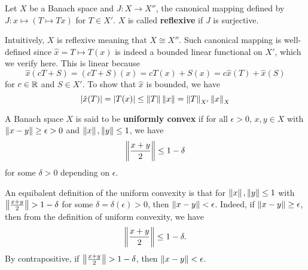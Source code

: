 \begin{definition}
    Let $X$ be a Banach space and $J:X\to X''$, the canonical mapping 
    defined by $J:x\mapsto(T\mapsto Tx)$ for $T\in X'$. $X$ is called 
    \textbf{reflexive} if $J$ is surjective. 
\end{definition}
\begin{remark}
    Intuitively, $X$ is reflexive meaning that $X\cong X''$. Such canonical 
    mapping is well-defined since $\hat{x} = T\mapsto T(x)$ is indeed a bounded linear 
    functional on $X'$, which we verify here. This is linear because 
    \begin{equation*}
        \hat{x}(cT + S) = (cT + S)(x) = cT(x) + S(x) = c\hat{x}(T) + \hat{x}(S)
    \end{equation*}
    for $c\in\mathbb{R}$ and $S\in X'$. To show that $\hat{x}$ is bounded, we have 
    \begin{equation*}
        \left\lvert {\hat{x}(T)} \right\rvert = \left\lvert {T(x)} \right\rvert \leq \left\lVert {T} \right\rVert\left\lVert {x} \right\rVert = \left\lVert {T} \right\rVert_{X'}\left\lVert {x} \right\rVert_{X}
    \end{equation*}
\end{remark}

\begin{definition}
    A Banach space $X$ is said to be \textbf{uniformly convex} if for 
    all $\epsilon>0$, $x,y\in X$ with $\left\lVert {x-y} \right\rVert\geq \epsilon>0$ and 
    $\left\lVert {x} \right\rVert,\left\lVert {y} \right\rVert\leq 1$, we have 
    \begin{equation*}
        \left\lVert {\frac{x+y}{2}} \right\rVert \leq 1-\delta
    \end{equation*}
    for some $\delta>0$ depending on $\epsilon$.
\end{definition}
\begin{remark}
    An equibalent definition of the uniform convexity is that for 
    $\left\lVert {x} \right\rVert,\left\lVert {y} \right\rVert\leq 1$ with $\left\lVert {\frac{x+y}{2}} \right\rVert> 1-\delta$ 
    for some $\delta = \delta(\epsilon)>0$, then $\left\lVert {x-y} \right\rVert< \epsilon$. 
    Indeed, if $\left\lVert {x-y} \right\rVert\geq\epsilon$, then from the 
    definition of uniform convexity, we have 
    \begin{equation*}
        \left\lVert {\frac{x+y}{2}} \right\rVert \leq 1-\delta.
    \end{equation*}
    By contrapositive, if $\left\lVert {\frac{x+y}{2}} \right\rVert> 1-\delta$, then 
    $\left\lVert {x-y} \right\rVert<\epsilon$.
\end{remark}

